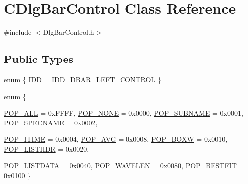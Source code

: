 \hypertarget{classCDlgBarControl}{
\section{CDlgBarControl Class Reference}
\label{classCDlgBarControl}
}


{\ttfamily \#include $<$DlgBarControl.h$>$}

\subsection*{Public Types}
\begin{DoxyCompactItemize}
\item 
enum \{ \hyperlink{classCDlgBarControl_a27da53850b6ff0310dfc9dfb70688df0a77fbc02aac0dbba80d96b0777acb9994}{IDD} =  IDD\_\-DBAR\_\-LEFT\_\-CONTROL
 \}
\item 
enum \{ \par
\hyperlink{classCDlgBarControl_a715cd4283e319fb9ad80a3c536866264aef5b1280fc233c4f13f11be5846da754}{POP\_\-ALL} =  0xFFFF, 
\hyperlink{classCDlgBarControl_a715cd4283e319fb9ad80a3c536866264a4ebd43c3963e736e5f2d58f24f344b54}{POP\_\-NONE} =  0x0000, 
\hyperlink{classCDlgBarControl_a715cd4283e319fb9ad80a3c536866264aa744977ee2add63a666899ba66f221e1}{POP\_\-SUBNAME} =  0x0001, 
\hyperlink{classCDlgBarControl_a715cd4283e319fb9ad80a3c536866264a432ee0b5781b5122705e08e823f0de47}{POP\_\-SPECNAME} =  0x0002, 
\par
\hyperlink{classCDlgBarControl_a715cd4283e319fb9ad80a3c536866264a0eef8c062dd3c20c294bf31b3eccc280}{POP\_\-ITIME} =  0x0004, 
\hyperlink{classCDlgBarControl_a715cd4283e319fb9ad80a3c536866264a68b404b0fa2af4eb91a50e3f12188a76}{POP\_\-AVG} =  0x0008, 
\hyperlink{classCDlgBarControl_a715cd4283e319fb9ad80a3c536866264a6f413cfa233601cd37549a2289d25c59}{POP\_\-BOXW} =  0x0010, 
\hyperlink{classCDlgBarControl_a715cd4283e319fb9ad80a3c536866264a9d4d6f208d25a2c59ce1b81723b0d60f}{POP\_\-LISTHDR} =  0x0020, 
\par
\hyperlink{classCDlgBarControl_a715cd4283e319fb9ad80a3c536866264ab9cc5597bf1981c364566522a97d47ac}{POP\_\-LISTDATA} =  0x0040, 
\hyperlink{classCDlgBarControl_a715cd4283e319fb9ad80a3c536866264a16cfd14c0148c5f5677b3c281dafabe4}{POP\_\-WAVELEN} =  0x0080, 
\hyperlink{classCDlgBarControl_a715cd4283e319fb9ad80a3c536866264a38e8edc504e50d1707cfd5c47834edda}{POP\_\-BESTFIT} =  0x0100
 \}
\end{DoxyCompactItemize}
